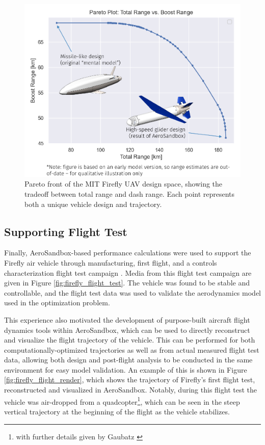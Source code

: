 \begin{figure}[h]
    \centering
    \includegraphics[width=\textwidth]{../figures/firefly_pareto-crop.pdf}
    \caption{Pareto front of the MIT Firefly UAV design space, showing the tradeoff between total range and dash range. Each point represents both a unique vehicle design and trajectory.}
    \label{fig:firefly_pareto}
\end{figure}

\subsection{Supporting Flight Test}

Finally, AeroSandbox-based performance calculations were used to support the Firefly air vehicle through manufacturing, first flight, and a controls characterization flight test campaign \cite{gaubatz_design_2024}. Media from this flight test campaign are given in Figure \ref{fig:firefly_flight_test}. The vehicle was found to be stable and controllable, and the flight test data was used to validate the aerodynamics model used in the optimization problem.

This experience also motivated the development of purpose-built aircraft flight dynamics tools within AeroSandbox, which can be used to directly reconstruct and visualize the flight trajectory of the vehicle. This can be performed for both computationally-optimized trajectories as well as from actual measured flight test data, allowing both design and post-flight analysis to be conducted in the same environment for easy model validation. An example of this is shown in Figure \ref{fig:firefly_flight_render}, which shows the trajectory of Firefly's first flight test, reconstructed and visualized in AeroSandbox. Notably, during this flight test the vehicle was air-dropped from a quadcopter\footnote{with further details given by Gaubatz \cite{gaubatz_design_2024}}, which can be seen in the steep vertical trajectory at the beginning of the flight as the vehicle stabilizes.

